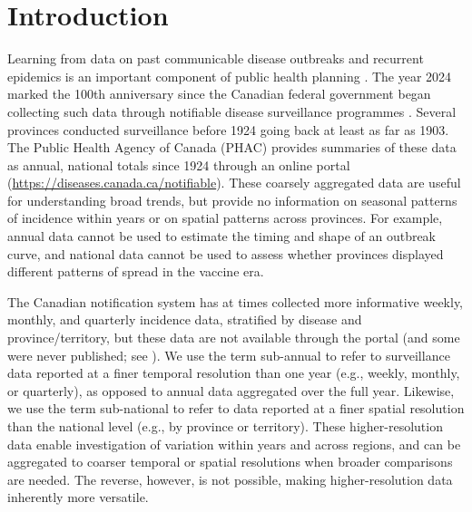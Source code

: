 \documentclass[12pt]{article}
\begin{document}
\newpage

\section{Introduction}\label{sec:intro}

Learning from data on past communicable disease outbreaks and recurrent epidemics is an important component of public health planning \cite{AndeMay91,Earn+00,BaucEarn03,HempEarn15,ogden2024mathematical}. The year 2024 marked the 100th anniversary since the Canadian federal government began collecting such data through notifiable disease surveillance programmes \cite{summaryNotifiable1954,sockett1996communicable,carter1991establishing,doherty2000establishing,totten2019updates}. Several provinces conducted surveillance before 1924 going back at least as far as 1903. The Public Health Agency of Canada (PHAC) provides summaries of these data as annual, national totals since 1924 through an online portal (\url{https://diseases.canada.ca/notifiable}). These coarsely aggregated data are useful for understanding broad trends, but provide no information on seasonal patterns of incidence within years or on spatial patterns across provinces. For example, annual data cannot be used to estimate the timing and shape of an outbreak curve, and national data cannot be used to assess whether provinces displayed different patterns of spread in the vaccine era.

The Canadian notification system has at times collected more informative weekly, monthly, and quarterly incidence data, stratified by disease and province/territory, but these data are not available through the portal (and some were never published; see \cite{summaryNotifiable1954}). We use the term sub-annual to refer to surveillance data reported at a finer temporal resolution than one year (e.g., weekly, monthly, or quarterly), as opposed to annual data aggregated over the full year. Likewise, we use the term sub-national to refer to data reported at a finer spatial resolution than the national level (e.g., by province or territory). These higher-resolution data enable investigation of variation within years and across regions, and can be aggregated to coarser temporal or spatial resolutions when broader comparisons are needed. The reverse, however, is not possible, making higher-resolution data inherently more versatile.
\end{document}
